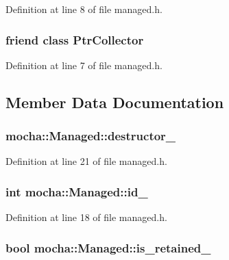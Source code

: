 Definition at line 8 of file managed.h.

\hypertarget{classmocha_1_1_managed_a73d86f43b616a0898e6309038ca76ee8}{
\subsubsection[{PtrCollector}]{\setlength{\rightskip}{0pt plus 5cm}friend class {\bf PtrCollector}}}
\label{classmocha_1_1_managed_a73d86f43b616a0898e6309038ca76ee8}


Definition at line 7 of file managed.h.



\subsection{Member Data Documentation}
\hypertarget{classmocha_1_1_managed_a675129a376db51da9f6f1b510ce5c006}{
\subsubsection[{destructor\_\-}]{ {\bf mocha::Managed::destructor\_\-}}}
\label{classmocha_1_1_managed_a675129a376db51da9f6f1b510ce5c006}


Definition at line 21 of file managed.h.

\hypertarget{classmocha_1_1_managed_a363b983b4bd61e3beb5766882bab832c}{
\subsubsection[{id\_\-}]{\setlength{\rightskip}{0pt plus 5cm}int {\bf mocha::Managed::id\_\-}}}
\label{classmocha_1_1_managed_a363b983b4bd61e3beb5766882bab832c}


Definition at line 18 of file managed.h.

\hypertarget{classmocha_1_1_managed_ab54c73d26d18b29a750f1059634cb1cc}{
\subsubsection[{is\_\-retained\_\-}]{\setlength{\rightskip}{0pt plus 5cm}bool {\bf mocha::Managed::is\_\-retained\_\-}}}
\label{classmocha_1_1_managed_ab54c73d26d18b29a750f1059634cb1cc}


